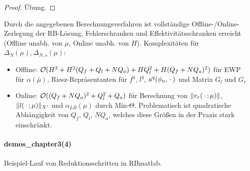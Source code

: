 \begin{proof}
	Übung.
\end{proof}

\begin{bem}[Komplexitäten]
	Durch die angegebenen Berechnungsverfahren ist vollständige Offline-/Online-Zerlegung der RB-Lösung, Fehlerschranken und Effektivitätsschranken erreicht (Offline unabh. von $\mu$, Online unabh. von $H$). Komplexitäten für $\Delta_N(\mu), \Delta_{N,s}(\mu)$:
	\begin{itemize}
		\item Offline: $\mathcal O(H^3 + H^2 (Q_f + Q_l + N Q_a) + H Q_l^2 + H(Q_f + NQ_a)^2)$ für EWP für $\alpha(\bar{\mu})$,
			Riesz-Repräsentanten für $f^q$, $l^q$, $a^q(\phi_n,\pdot)$ und Matrix $G_l$ und $G_r$
		\item Online: $\mathcal O((Q_f+N Q_a)^2 + Q_l^2 + Q_a)$ für Berechnung von $\|v_r(\,\cdot\,;\mu)\|$, $\|l(\,\cdot\,;\mu)\|_{X'}$ und $\alpha_{LB}(\mu)$ durch Min-$\Theta$.
			Problematisch ist quadratische Abhängigkeit von $Q_f$, $Q_l$, $N Q_a$, welches diese Größen in der Praxis stark einschränkt.
	\end{itemize}
\end{bem}

\paragraph{demos\_chapter3(4)} Beispiel-Lauf von Reduktionsschritten in RBmatlab.


